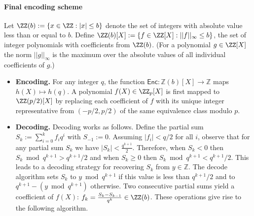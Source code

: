 \paragraph{Final encoding scheme} Let $\ZZ(b):=\{x \in \ZZ: \vert x \vert  \leq b\}$ denote the set of integers with absolute value less than or equal to $b$.  Define $\ZZ(b)[X] := \{f \in \ZZ[X]: ||f||_\infty \leq b\}$, the set of integer polynomials with coefficients from $\ZZ(b)$. (For a polynomial $g \in \ZZ[X]$ the norm $||g||_\infty$ is the maximum over the absolute values of all individual coefficients of $g$.)
\begin{itemize} 

\item \textbf{Encoding.}
For any integer $q$, the function $\mathsf{Enc} : \mathbb{Z}(b)[X] \rightarrow \mathbb{Z}$ maps $h(X) \mapsto h(q)$. A polynomial $f(X) \in \ZZ_p[X]$ is first mapped to $\ZZ(p/2)[X]$ by replacing each coefficient of $f$ with its unique integer representative from $(-p/2,p/2)$ of the same equivalence class modulo $p$.  %

\item \textbf{Decoding.}
Decoding works as follows. Define the partial sum $S_k := \sum_{i=0}^k f_i q^i$ with $S_{-1} := 0$. Assuming $|f_i| < q/2$ for all $i$, observe that for any partial sum $S_k$ we have $|S_k|<\frac{q^{k+1}}{2}$. Therefore, when $S_k < 0$ then $S_k \bmod q^{k+1} > q^{k+1}/2$ and when $S_k \geq 0$ then $S_k \bmod q^{k+1} < q^{k+1}/2$. 
This leads to a decoding strategy for recovering $S_k$ from $y \in \mathbb{Z}$. The decode algorithm sets $S_k$ to $y \bmod q^{k+1}$ if this value is less than $q^{k+1}/2$ and to $q^{k+1}- (y \bmod q^{k+1})$ otherwise.
Two consecutive partial sums yield a coefficient of $f(X)$: $f_k = \frac{S_{k} - S_{k-1}}{q^{k}} \in \ZZ(b)$. These operations give rise to the following algorithm.\\
\end{itemize}

